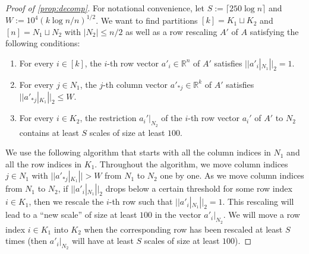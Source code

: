 \documentclass[reqno]{amsart}
\theoremstyle{remark}
\theoremstyle{definition}
\numberwithin{theorem}{section}
\renewcommand{\(}{\bigl(}
\renewcommand{\)}{\bigr)\vphantom{)}}
\renewcommand{\le}{\leqslant}
\newcommand{\R}{\mathbb R}
\newcommand{\ceil}[1]{\lceil#1\rceil}
\begin{document}
\begin{proof}[Proof of \cref{prop:decomp}]
    For notational convenience, let $S:= \ceil{250\log n}$ and $W:= 10^4(k\log n/n)^{1/2}$. We want to find partitions $[k] = K_1\sqcup K_2$ and $[n] = N_1\sqcup N_2$ with $|N_2|\le n/2$ as well as a row rescaling $A'$ of $A$ satisfying the following conditions:
    \begin{enumerate}
    \item For every $i\in [k]$, the $i$-th row vector $a'_i\in \R^n$ of $A'$ satisfies $||a'_i|_{N_1}||_2 = 1$.

    \item For every $j\in N_1$, the $j$-th column vector $a'_{*j}\in \R^k$ of $A'$ satisfies $||a'_{*j}|_{K_1}||_2\le  W$.

    \item For every $i\in K_2$, the restriction $a_i'|_{N_2}$ of the $i$-th row vector $a_i'$ of $A'$ to $N_2$ contains at least $S$ scales of size at least $100$.
\end{enumerate}

    We use the following algorithm that starts with all the column indices in $N_1$ and all the row indices in $K_1$. Throughout the algorithm, we move column indices $j\in N_1$ with $||a'_{*j}|_{K_1}||>W$ from $N_1$ to $N_2$ one by one. As we move column indices from $N_1$ to $N_2$, if $||a'_i|_{N_1}||_2$ drops below a certain threshold for some row index $i\in K_1$, then we rescale the $i$-th row such that $||a'_i|_{N_1}||_2=1$. This rescaling will lead to a ``new scale'' of size at least $100$ in the vector $a'_i|_{N_2}$. We will move a row index $i\in K_1$ into $K_2$ when the corresponding row has been rescaled at least $S$ times (then $a'_i|_{N_2}$ will have at least $S$ scales of size at least $100$). 


\end{proof}
\end{document}
